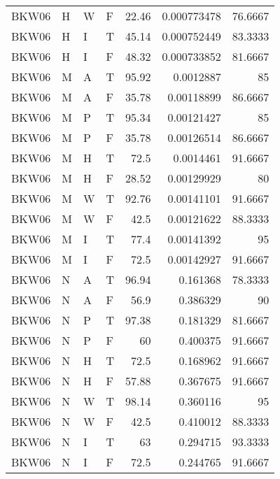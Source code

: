 \begin{table}[htb!]
{\begin{tabular}{llllrrr}
            BKW06    & H     & W     & F          & 22.46      & 0.000773478 & 76.6667  \\
            BKW06    & H     & I     & T          & 45.14      & 0.000752449 & 83.3333  \\
            BKW06    & H     & I     & F          & 48.32      & 0.000733852 & 81.6667  \\
            BKW06    & M     & A     & T          & 95.92      & 0.0012887   & 85       \\
            BKW06    & M     & A     & F          & 35.78      & 0.00118899  & 86.6667  \\
            BKW06    & M     & P     & T          & 95.34      & 0.00121427  & 85       \\
            BKW06    & M     & P     & F          & 35.78      & 0.00126514  & 86.6667  \\
            BKW06    & M     & H     & T          & 72.5       & 0.0014461   & 91.6667  \\
            BKW06    & M     & H     & F          & 28.52      & 0.00129929  & 80       \\
            BKW06    & M     & W     & T          & 92.76      & 0.00141101  & 91.6667  \\
            BKW06    & M     & W     & F          & 42.5       & 0.00121622  & 88.3333  \\
            BKW06    & M     & I     & T          & 77.4       & 0.00141392  & 95       \\
            BKW06    & M     & I     & F          & 72.5       & 0.00142927  & 91.6667  \\
            BKW06    & N     & A     & T          & 96.94      & 0.161368    & 78.3333  \\
            BKW06    & N     & A     & F          & 56.9       & 0.386329    & 90       \\
            BKW06    & N     & P     & T          & 97.38      & 0.181329    & 81.6667  \\
            BKW06    & N     & P     & F          & 60         & 0.400375    & 91.6667  \\
            BKW06    & N     & H     & T          & 72.5       & 0.168962    & 91.6667  \\
            BKW06    & N     & H     & F          & 57.88      & 0.367675    & 91.6667  \\
            BKW06    & N     & W     & T          & 98.14      & 0.360116    & 95       \\
            BKW06    & N     & W     & F          & 42.5       & 0.410012    & 88.3333  \\
            BKW06    & N     & I     & T          & 63         & 0.294715    & 93.3333  \\
            BKW06    & N     & I     & F          & 72.5       & 0.244765    & 91.6667  \\
            \hline
        \end{tabular}
    }{
    }
\end{table} 
